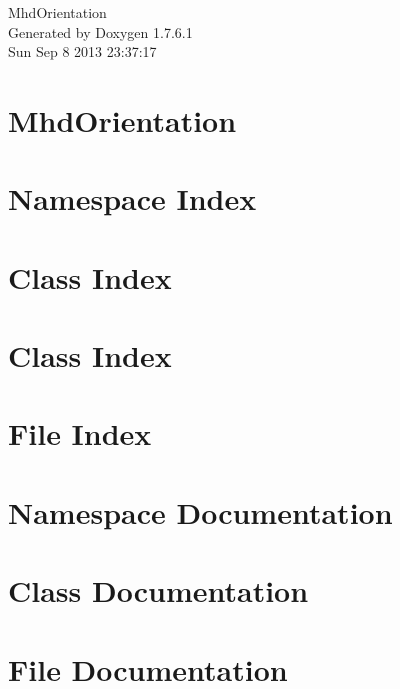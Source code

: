 \documentclass[a4paper]{book}
\begin{document}
\hypersetup{pageanchor=false,citecolor=blue}
\begin{titlepage}
\vspace*{7cm}
\begin{center}
{\Large \-Mhd\-Orientation }\\
\vspace*{1cm}
{\large \-Generated by Doxygen 1.7.6.1}\\
\vspace*{0.5cm}
{\small Sun Sep 8 2013 23:37:17}\\
\end{center}
\end{titlepage}
\clearemptydoublepage
{}
\tableofcontents
\clearemptydoublepage
{}
\hypersetup{pageanchor=true,citecolor=blue}
\chapter{\-Mhd\-Orientation}
\label{index}\hypertarget{index}{}
\chapter{\-Namespace \-Index}

\chapter{\-Class \-Index}

\chapter{\-Class \-Index}

\chapter{\-File \-Index}

\chapter{\-Namespace \-Documentation}


\chapter{\-Class \-Documentation}









\chapter{\-File \-Documentation}














\printindex
\end{document}
